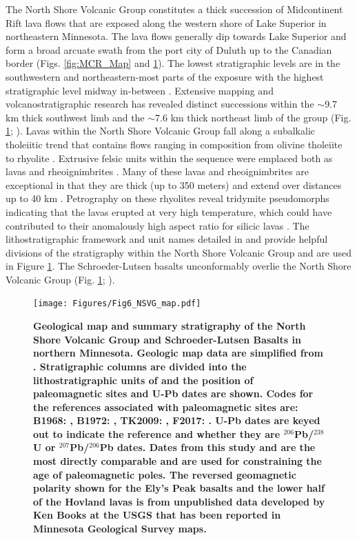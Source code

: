 \documentclass[11pt,letterpaper]{article}
\begin{document}
The North Shore Volcanic Group constitutes a thick succession of Midcontinent Rift lava flows that are exposed along the western shore of Lake Superior in northeastern Minnesota. The lava flows generally dip towards Lake Superior and form a broad arcuate swath from the port city of Duluth up to the Canadian border (Figs. \ref{fig:MCR_Map} and \ref{fig:NSVG_Map}). The lowest stratigraphic levels are in the southwestern and northeastern-most parts of the exposure with the highest stratigraphic level midway in-between \citep{Miller2001a}. Extensive mapping and volcanostratigraphic research has revealed distinct successions within the $\sim$9.7 km thick  southwest limb and the $\sim$7.6 km thick northeast limb of the group (Fig. \ref{fig:NSVG_Map}; \citealp{Green1993a, Davis1997a}). Lavas within the North Shore Volcanic Group fall along a subalkalic tholeiitic trend that contains flows ranging in composition from olivine tholeiite to rhyolite \citep{Green2002a}. Extrusive felsic units within the sequence were emplaced both as lavas and rheoignimbrites \citep{Green1993a}. Many of these lavas and rheoignimbrites are exceptional in that they are thick (up to 350 meters) and extend over distances up to 40 km \citep{Green1993a, Miller2001a}. Petrography on these rhyolites reveal tridymite pseudomorphs indicating that the lavas erupted at very high temperature, which could have contributed to their anomalously high aspect ratio for silicic lavas \citep{Green1993a}. The lithostratigraphic framework and unit names detailed in \citet{Green2002a} and \citet{Green2011a} provide helpful divisions of the stratigraphy within the North Shore Volcanic Group and are used in Figure \ref{fig:NSVG_Map}. The Schroeder-Lutsen basalts unconformably overlie the North Shore Volcanic Group (Fig. \ref{fig:NSVG_Map}; \citealp{Green2011a}).

\begin{figure}
\caption{\small{\textbf{Geological map and summary stratigraphy of the North Shore Volcanic Group and Schroeder-Lutsen Basalts in northern Minnesota. Geologic map data are simplified from \cite{Miller2001a}. Stratigraphic columns are divided into the lithostratigraphic units of \cite{Green2002a} and the position of paleomagnetic sites and U-Pb dates are shown. Codes for the references associated with paleomagnetic sites are: B1968: \cite{Books1968a}, B1972: \cite{Books1972a}, TK2009: \cite{Tauxe2009a}, F2017: \cite{Fairchild2017a}. U-Pb dates are keyed out to indicate the reference and whether they are $^{206}$Pb/$^{238}$U or $^{207}$Pb/$^{206}$Pb dates. Dates from this study and \cite{Fairchild2017a} are the most directly comparable and are used for constraining the age of paleomagnetic poles. The reversed geomagnetic polarity shown for the Ely's Peak basalts and the lower half of the Hovland lavas is from unpublished data developed by Ken Books at the USGS that has been reported in Minnesota Geological Survey maps.}}}
\label{fig:NSVG_Map}
\texttt{[image: Figures/Fig6\_NSVG\_map.pdf]}
\end{figure}
\end{document}
